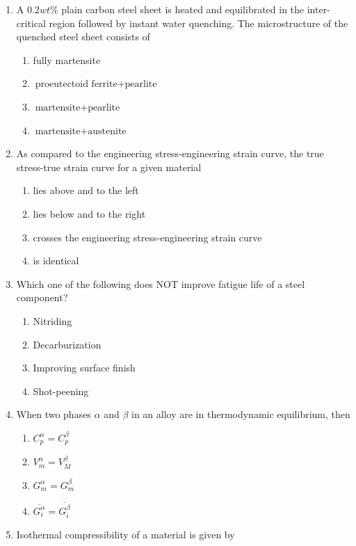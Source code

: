 \documentclass[journal]{IEEEtran}
\theoremstyle{remark}
\begin{document}
\begin{enumerate}
\item A $0.2 wt\%$ plain carbon steel sheet is heated and equilibrated in the inter-critical region followed by instant water quenching. The microstructure of the quenched steel sheet consists of\hfill{}
\begin{multicols}{2}
\begin{enumerate}
\item fully martensite 
\item $\text{proeutectoid ferrite} + \text{pearlite} $
\item $\text{martensite} + \text{pearlite } $  
\item $\text{martensite} + \text{austenite } $

\end{enumerate}
\end{multicols}

\item As compared to the engineering stress-engineering strain curve, the true stress-true strain curve for a given material  \hfill{}
\begin{enumerate}
\item lies above and to the left
\item  lies below and to the right
\item  crosses the engineering stress-engineering strain curve 
\item  is identical 
\end{enumerate}

\item Which one of the following does NOT improve fatigue life of a steel component? 

\hfill{}
\begin{multicols}{2}
\begin{enumerate}
\item Nitriding 
\item Decarburization 
\item  Improving surface finish
\item Shot-peening    
\end{enumerate}
\end{multicols}
\item When two phases $\alpha$ and $\beta$ in an alloy are in thermodynamic equilibrium, then\hfill{}
\begin{multicols}{4}
\begin{enumerate}
        \item $C_p^\alpha=C_p^\beta$
        \item $V_m^\alpha=V_M^\beta$
        \item $G_m^\alpha=G_m^\beta$
        \item $\overline{G_i^\alpha} = \overline{G_i^\beta}$
\end{enumerate}
\end{multicols}
\item Isothermal compressibility of a material is given by \hfill{}


\end{enumerate}
\end{document}
